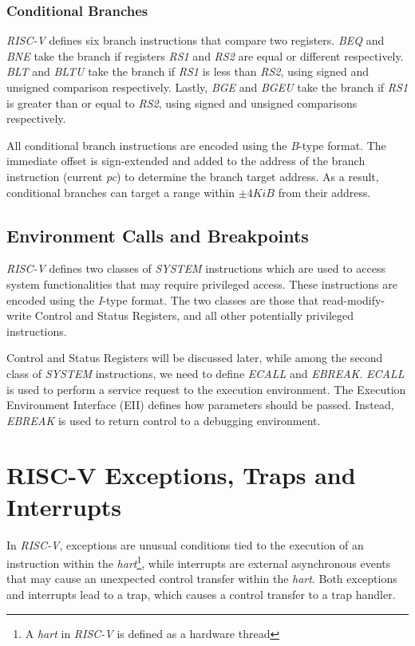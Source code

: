 \subsubsection{Conditional Branches}
\label{subsubsec:riscv_conditionalb}

\textit{RISC-V} defines six branch instructions that compare two registers.
\textit{BEQ} and \textit{BNE} take the branch if registers \textit{RS1} and \textit{RS2}
are equal or different respectively. \textit{BLT} and \textit{BLTU} take the branch
if \textit{RS1} is less than \textit{RS2}, using signed and unsigned comparison
respectively. Lastly, \textit{BGE} and \textit{BGEU} take the branch if \textit{RS1}
is greater than or equal to \textit{RS2}, using signed and unsigned comparisons respectively.

All conditional branch instructions are encoded using the \textit{B}-type format.
The immediate offset is sign-extended and added to the address of the branch instruction
(current \textit{pc}) to determine the branch target address. As a result,
conditional branches can target a range within $\pm 4 \textit{KiB}$ from their
address.

\subsection{Environment Calls and Breakpoints}
\label{subsec:riscv_ecalls}

\textit{RISC-V} defines two classes of \textit{SYSTEM} instructions which are used
to access system functionalities that may require privileged access. These
instructions are encoded using the \textit{I}-type format. The two classes are
those that read-modify-write Control and Status Registers, and all other potentially
privileged instructions.

Control and Status Registers will be discussed later, while among the second
class of \textit{SYSTEM} instructions, we need to define \textit{ECALL} and \textit{EBREAK}.
\textit{ECALL} is used to perform a service request to the execution environment.
The Execution Environment Interface (EII) defines how parameters should be passed.
Instead, \textit{EBREAK} is used to return control to a debugging environment.

\section{RISC-V Exceptions, Traps and Interrupts}
\label{sec:riscv_eti}

In \textit{RISC-V}, exceptions are unusual conditions tied to the execution of an
instruction within the \textit{hart}\footnote{A \textit{hart} in \textit{RISC-V}
is defined as a hardware thread}, while interrupts are external asynchronous
events that may cause an unexpected control transfer within the \textit{hart}.
Both exceptions and interrupts lead to a trap, which causes a control transfer to
a trap handler.

